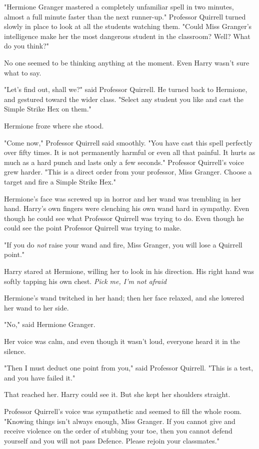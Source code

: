 "Hermione Granger mastered a completely unfamiliar spell in two minutes, almost
a full minute faster than the next runner-up." Professor Quirrell turned slowly
in place to look at all the students watching them. "Could Miss Granger's
intelligence make her the most dangerous student in the classroom? Well? What
do you think?"

No one seemed to be thinking anything at the moment. Even Harry wasn't sure
what to say.

"Let's find out, shall we?" said Professor Quirrell. He turned back to
Hermione, and gestured toward the wider class. "Select any student you like and
cast the Simple Strike Hex on them."

Hermione froze where she stood.

"Come now," Professor Quirrell said smoothly. "You have cast this spell
perfectly over fifty times. It is not permanently harmful or even all that
painful. It hurts as much as a hard punch and lasts only a few seconds."
Professor Quirrell's voice grew harder. "This is a direct order from your
professor, Miss Granger. Choose a target and fire a Simple Strike Hex."

Hermione's face was screwed up in horror and her wand was trembling in her
hand. Harry's own fingers were clenching his own wand hard in sympathy. Even
though he could see what Professor Quirrell was trying to do. Even though he
could see the point Professor Quirrell was trying to make.

"If you do \emph{not} raise your wand and fire, Miss Granger, you will lose a
Quirrell point."

Harry stared at Hermione, willing her to look in his direction. His right hand
was softly tapping his own chest. \emph{Pick me, I'm not afraid{\el}}

Hermione's wand twitched in her hand; then her face relaxed, and she lowered
her wand to her side.

"No," said Hermione Granger.

Her voice was calm, and even though it wasn't loud, everyone heard it in the
silence.

"Then I must deduct one point from you," said Professor Quirrell. "This is a
test, and you have failed it."

That reached her. Harry could see it. But she kept her shoulders straight.

Professor Quirrell's voice was sympathetic and seemed to fill the whole room.
"Knowing things isn't always enough, Miss Granger. If you cannot give and
receive violence on the order of stubbing your toe, then you cannot defend
yourself and you will not pass Defence. Please rejoin your classmates."

